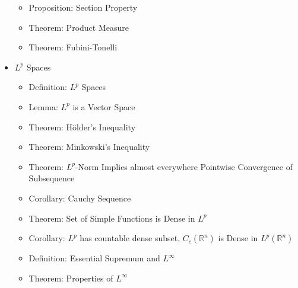 \documentclass[8pt,twocolumn]{article}
\begin{document}
\begin{itemize}
\begin{itemize}
            \item Proposition: Section Property
            \item Theorem: Product Measure
            \item Theorem: Fubini-Tonelli
          \end{itemize}
        \item $L^p$ Spaces
          \begin{itemize}
            \item Definition: $L^p$ Spaces
            \item Lemma: $L^p$ is a Vector Space
            \item Theorem: Hölder's Inequality
            \item Theorem: Minkowski's Inequality
            \item Theorem: $L^p$-Norm Implies almost everywhere Pointwise Convergence of Subsequence
            \item Corollary: Cauchy Sequence
            \item Theorem: Set of Simple Functions is Dense in $L^p$
            \item Corollary: $L^p$ has countable dense subset, $C_c(\mathds{R}^n)$ is Dense in $L^p(\mathds{R}^n)$
            \item Definition: Essential Supremum and $L^\infty$
            \item Theorem: Properties of $L^\infty$
          \end{itemize}
      \end{itemize}
\end{document}
